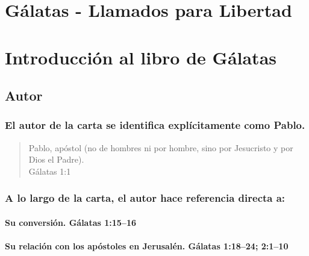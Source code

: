 \documentclass[11a pt,twoside]{article}
\def\textbf#1{#1}%
\let\oldsection\section
\renewcommand{\section}{\needspace{6\baselineskip}\oldsection}
\let\oldsubsection\subsection
\renewcommand{\subsection}{\needspace{5\baselineskip}\oldsubsection}
\let\oldsubsubsection\subsubsection
\renewcommand{\subsubsection}{\needspace{4\baselineskip}\oldsubsubsection}
\let\oldparagraph\paragraph
\renewcommand{\paragraph}{\needspace{3\baselineskip}\oldparagraph}
\let\oldcr\\%
\def\\{\oldcr\normalfont}%
\begin{document}
\setcounter{page}{2}

\section{Gálatas - Llamados para
Libertad}\label{guxe1latas---llamados-para-libertad}

\section{Introducción al libro de
Gálatas}\label{introducciuxf3n-al-libro-de-guxe1latas}

\subsection{Autor}\label{autor}

\subsubsection{\texorpdfstring{El autor de la carta se identifica
explícitamente como
\textbf{Pablo}.}{El autor de la carta se identifica explícitamente como Pablo.}}\label{el-autor-de-la-carta-se-identifica-expluxedcitamente-como-pablo.}

\begin{quote}
Pablo, apóstol (no de hombres ni por hombre, sino por Jesucristo y por
Dios el Padre).\\
Gálatas 1:1
\end{quote}

\subsubsection{A lo largo de la carta, el autor hace referencia directa
a:}\label{a-lo-largo-de-la-carta-el-autor-hace-referencia-directa-a}

\paragraph{Su conversión. Gálatas
1:15--16}\label{su-conversiuxf3n.-guxe1latas-11516}

\paragraph{Su relación con los apóstoles en Jerusalén. Gálatas 1:18--24;
2:1--10}\label{su-relaciuxf3n-con-los-apuxf3stoles-en-jerusaluxe9n.-guxe1latas-11824-2110}
\end{document}
